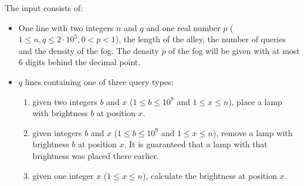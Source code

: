 
	The input consists of:
	\begin{itemize}
		\item One line with two integers $n$ and $q$ and one real number $p$  ($1\leq n, q\leq 2\cdot10^5, 0 < p < 1$),
		the length of the alley, the number of queries and the density of the fog.
		The density $p$ of the fog will be given with at most $6$ digits behind the decimal point.
		\item $q$ lines containing one of three query types:
		\begin{enumerate}[leftmargin=4em, topsep=0pt]
			\item[``\textbf{\texttt{+ b x}}''] given two integers $b$ and $x$ ($1\leq b \leq 10^9$ and $1\leq x \leq n$), place a lamp with brightness $b$ at position $x$.
			\item[``\textbf{\texttt{- b x}}''] given integers $b$ and $x$ ($1\leq b \leq 10^9$ and $1\leq x \leq n$), remove a lamp with brightness $b$ at position $x$.
			It is guaranteed that a lamp with that brightness was placed there earlier. 
			\item[``\textbf{\texttt{?~x}}''] given one integer $x$ ($1\leq x \leq n$), calculate the brightness at position $x$.
		\end{enumerate}
	\end{itemize}
